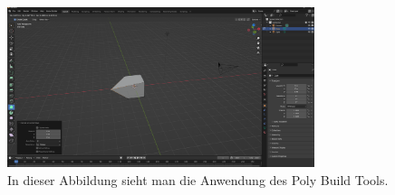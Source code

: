 \begin{itemize}
\begin{figure}[H]
        \centering
        \includegraphics[width=0.8\textwidth]{chapters/13/images/PolyBuild.png}
        \caption{In dieser Abbildung sieht man die Anwendung des Poly Build Tools.}
        \label{UST-13}
    \end{figure}
\end{itemize}

